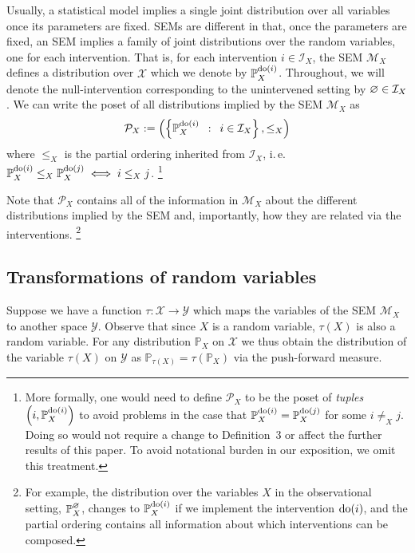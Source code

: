 Usually, a statistical model implies a single joint distribution over all variables once its parameters are fixed.
SEMs are different in that, once the parameters are fixed, an SEM implies a family of joint distributions over the random variables, one for each intervention.
That is, for each intervention $i \in \mathcal{I}_X$, the SEM $\mathcal{M}_X$ defines a distribution over $\mathcal{X}$ which we denote by $\mathbb{P}_X^{\operatorname{do}(i)}$.
Throughout, we will denote the null-intervention corresponding to the unintervened setting by $\varnothing\in \mathcal{I}_X$ .
We can write the poset of all distributions implied by the SEM $\mathcal{M}_X$ as
\[\mathcal{P}_X := \left( \left\{ \mathbb{P}_X^{\operatorname{do}(i)} \enspace : \enspace i \in \mathcal{I}_X \right\}, \leq_X \right) \]
where $\leq_X$ is the partial ordering inherited from $\mathcal{I}_X$, i.\,e.\ ${\mathbb{P}_X^{\operatorname{do}(i)} \leq_X \mathbb{P}_X^{\operatorname{do}(j)} \iff i \leq_X j}$.%
\footnote{More formally, one would need to define $\mathcal{P}_X$ to be the poset of \emph{tuples} $\left(i, \mathbb{P}_X^{\operatorname{do}(i)}\right)$ to avoid problems in the case that $\mathbb{P}_X^{\operatorname{do}(i)} = \mathbb{P}_X^{\operatorname{do}(j)}$ for some $i\not=_X j$. Doing so would not require a change to Definition~3 or affect the further results of this paper. To avoid notational burden in our exposition, we omit this treatment.}

Note that $\mathcal{P}_X$ contains all of the information in $\mathcal{M}_X$ about the different distributions implied by the SEM and, importantly, how they are related via the interventions.%
\footnote{For example, the distribution over the variables $X$ in the observational setting, $\mathbb{P}_X^\varnothing$, changes to $\mathbb{P}_X^{\operatorname{do}(i)}$ if we implement the intervention ${\operatorname{do}(i)}$, and the partial ordering contains all information about which interventions can be composed.}


\subsection{Transformations of random variables}

Suppose we have a function ${\tau: \mathcal{X} \to \mathcal{Y}}$ which maps the variables of the SEM $\mathcal{M}_X$ to another space $\mathcal{Y}$.
Observe that since $X$ is a random variable, $\tau(X)$ is also a random variable.
For any distribution $\mathbb{P}_X$ on $\mathcal{X}$ we thus obtain the distribution of the variable $\tau(X)$ on $\mathcal{Y}$ as $\mathbb{P}_{\tau(X)} = \tau\left(\mathbb{P}_X\right)$ via the push-forward measure.

